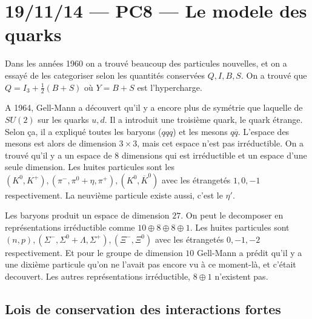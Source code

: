\documentclass[10pt]{report}
\begin{document}
\chapter{19/11/14 --- PC8 --- Le modele des quarks}

Dans les ann\'ees 1960 on a trouv\'e beaucoup des particules nouvelles, et on a essay\'e de les categoriser selon les quantit\'es conserv\'ees $Q,I,B,S$. On a trouv\'e que $Q = I_3 + \frac{1}{2}\left( B + S \right)$ o\`u $Y = B + S$ est l'hypercharge.

A 1964, Gell-Mann a d\'ecouvert qu'il y a encore plus de sym\'etrie que laquelle de $SU(2)$ sur les quarks $u,d$. Il a introduit une troisi\`eme quark, le quark \'etrange. Selon \c{c}a, il a expliqu\'e toutes les baryons ($qqq$) et les mesons $q\overline{q}$. L'espace des mesons est alors de dimension $3 \times 3$, mais cet espace n'est pas irr\'eductible. On a trouv\'e qu'il y a un espace de $8$ dimensions qui est irr\'eductible et un espace d'une seule dimension. Les huites particules sont les $(K^0, K^+), (\pi^-, \pi^0 + \eta, \pi^+),( K^0, \overline{K}^0)$ avec les \'etranget\'es $1,0,-1$ respectivement. La neuvi\`eme particule existe aussi, c'est le $\eta'$.

Les baryons produit un espace de dimension $27$. On peut le decomposer en repr\'esentations irr\'eductible comme $10 \oplus 8 \oplus 8 \oplus 1$. Les huites particules sont $(n,p), (\Sigma^-, \Sigma^0 + \Lambda, \Sigma^+),(\Xi^-, \Xi^0)$ avec les \'etranget\'es $0,-1,-2$ respectivement. Et pour le groupe de dimension $10$ Gell-Mann a pr\'edit qu'il y a une dixi\`eme particule qu'on ne l'avait pas encore vu \`a ce moment-l\`a, et c'\'etait decouvert. Les autres repr\'esentations irr\'eductible, $8 \oplus 1$ n'existent pas.

\section{Lois de conservation des interactions fortes}
\end{document}
